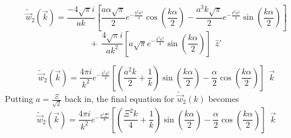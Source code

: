 \documentclass[double,12pt]{beavtex}
\begin{document}
\begin{equation}{\widetilde{\vec{w}}_2(\vec{k})=\frac{-4\sqrt{\pi}i}{ak}\left[\frac{a\alpha\sqrt{\pi}}{2}e^{-\frac{k^2a^2}{4}}\cos\left(\frac{k\alpha}{2}\right)-\frac{a^3k\sqrt{\pi}}{2}e^{-\frac{k^2a^2}{4}}\sin\left(\frac{k\alpha}{2}\right)\right]}\end{equation} 
\begin{displaymath}{+{~~}\frac{4\sqrt{\pi}i}{ak^2}\left[a\sqrt{\pi}e^{-\frac{k^2a^2}{4}}\sin\left(\frac{k\alpha}{2}\right)\right]{~~}\hat{z}'}\end{displaymath}

\begin{equation}{\widetilde{\vec{w}}_2(\vec{k})=\frac{4\pi{i}}{k^2}e^{-\frac{k^2a^2}{4}}\left[\left(\frac{a^2k}{2}+\frac{1}{k}\right)\sin\left(\frac{k\alpha}{2}\right)-\frac{\alpha}{2}\cos\left(\frac{k\alpha}{2}\right)\right]{~~}\vec{k}}\end{equation} 
Putting $a=\frac{\Xi}{\sqrt{2}}$ back in, the final equation for $\widetilde{\vec{w}}_2(k)$ becomes
\begin{equation}{\widetilde{\vec{w}}_2(\vec{k})=\frac{4\pi{i}}{k^2}e^{-\frac{k^2\Xi^2}{8}}\left[\left(\frac{\Xi^2k}{4}+\frac{1}{k}\right)\sin\left(\frac{k\alpha}{2}\right)-\frac{\alpha}{2}\cos\left(\frac{k\alpha}{2}\right)\right]{~~}\vec{k}}\end{equation} 
\end{document}
